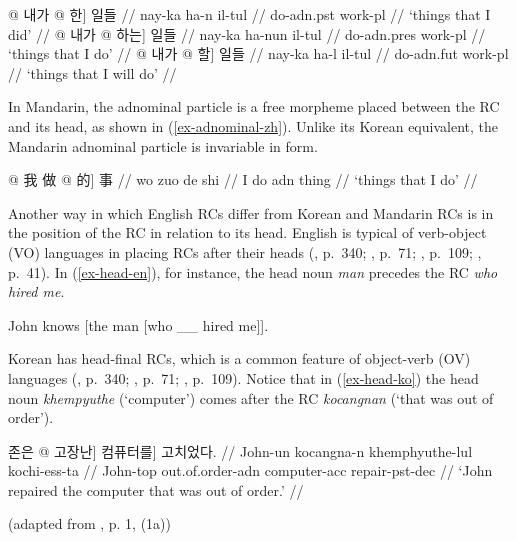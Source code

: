 \pex[everygla=\ko]\label{ex-adnominal-ko}
\a
\begingl
\gla \nogloss{\ko [} @ 내가 \nogloss{\_\_~~} @ 한{]} 일들 //
\glb nay-ka ha-n il-tul //
 do-{\sc adn.pst} work-{\sc pl} //
\glft `things that I did' //
\endgl
\a
\begingl
\gla \nogloss{\ko [} @ 내가 \nogloss{\_\_~~} @ 하는{]} 일들 //
\glb nay-ka ha-nun il-tul //
 do-{\sc adn.pres} work-{\sc pl} //
\glft `things that I do' //
\endgl
\a
\begingl
\gla \nogloss{\ko [} @ 내가 \nogloss{\_\_~~} @ 할{]} 일들 //
\glb nay-ka ha-l il-tul //
 do-{\sc adn.fut} work-{\sc pl} //
\glft `things that I will do' //
\endgl
\xe

\noindent In Mandarin, the adnominal particle is a free morpheme placed between the RC and its head, as shown in (\ref{ex-adnominal-zh}). Unlike its Korean equivalent, the Mandarin adnominal particle is invariable in form.

\ex[everygla=\zh]
\begingl
\gla \nogloss{\zh [} @ 我 做 \nogloss{\_\_~~} @ 的{]} 事 //
\glb wo zuo de shi //
\glc I do {\sc adn} thing //
\glft `things that I do' //
\endgl\label{ex-adnominal-zh}
\xe 

Another way in which English RCs differ from Korean and Mandarin RCs is in the position of the RC in relation to its head. English is typical of verb-object (VO) languages in placing RCs after their heads (\cite{dryer2011}, p.~340; \cite{greenberg1963}, p.~71; \cite{kim1990a}, p.~109; \cite{ogrady2022a}, p.~41). In (\ref{ex-head-en}), for instance, the head noun \textit{man} precedes the RC \textit{who hired me}.

\ex 
John knows [the man [who \_\_ hired me]].\label{ex-head-en}
\xe

Korean has head-final RCs, which is a common feature of object-verb (OV) languages (\cite{dryer2011}, p.~340; \cite{greenberg1963}, p.~71; \cite{kim1990a}, p.~109). Notice that in (\ref{ex-head-ko}) the head noun \textit{khempyuthe} (`computer') comes after the RC \textit{kocangnan} (`that was out of order').

\ex[everygla=\ko]
\begingl
\gla 존은 \nogloss{[[\ko \_\_ } @ 고장난{]} 컴퓨터를{]} 고치었다. //
\glb John-un kocangna-n khemphyuthe-lul kochi-ess-ta //
\glc John-{\sc top} out.of.order-{\sc adn} computer-{\sc acc} repair-{\sc pst-dec} //
\glft `John repaired the computer that was out of order.' //
\endgl
\par\nobreak\vspace{5pt}
\hfill (adapted from \cite{jhang1994}, p. 1, (1a)) \label{ex-head-ko}
\xe

